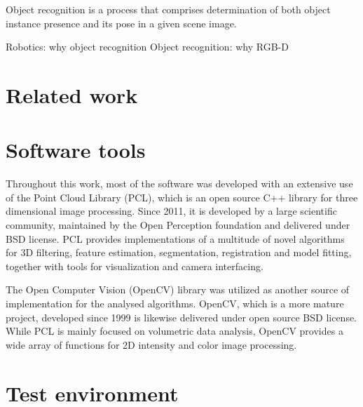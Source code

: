 Object recognition is a process that comprises determination of both object instance presence and its pose in a given scene image.   

Robotics: why object recognition
Object recognition: why RGB-D




\section{Related work}
\label{sec:related}



\section{Software tools}
\label{sec:software}

Throughout this work, most of the software was developed with an extensive use of the Point Cloud Library (PCL)\cite{Rusu_ICRA2011_PCL}, which is an open source C++ library for three dimensional image processing. Since 2011, it is developed by a large scientific community, maintained by the Open Perception foundation and delivered under BSD license. PCL provides implementations of a multitude of novel algorithms for 3D filtering, feature estimation, segmentation, registration and model fitting, together with tools for visualization and camera interfacing.

The Open Computer Vision (OpenCV)\cite{OpenCV} library was utilized as another source of implementation for the analysed algorithms. OpenCV, which is a more mature project, developed since 1999 is likewise delivered under open source BSD license. While PCL is mainly focused on volumetric data analysis, OpenCV provides a wide array of functions for 2D intensity and color image processing.








\section{Test environment}
\label{sec:testhardware}

